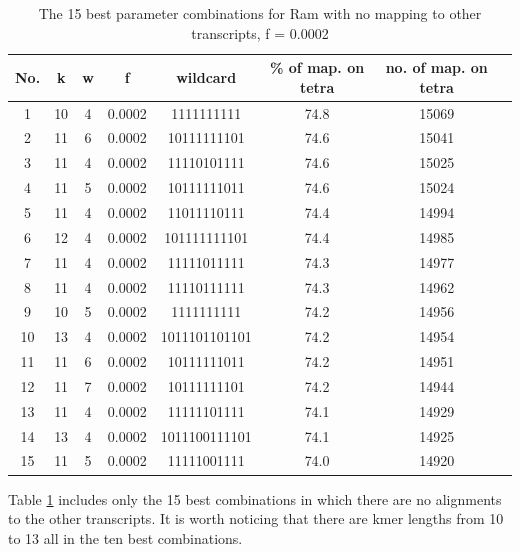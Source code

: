 \documentclass[times, utf8, zavrsni, numeric]{fer}
\begin{document}
\begin{longtable}{cccccccc}
    \caption {The 15 best parameter combinations for Ram with no mapping to other transcripts, f = 0.0002}
    \label {bestRamNoOther} \\
    \hline \multicolumn{1}{c}{\textbf{No.}} & \multicolumn{1}{c}{\textbf{k}} & \multicolumn{1}{c}{\textbf{w}}  
    & \multicolumn{1}{c}{\textbf{f}} & \multicolumn{1}{c}{\textbf{wildcard}} & \multicolumn{1}{c}{\textbf{\% of map. on tetra}}
    & \multicolumn{1}{c}{\textbf{no. of map. on tetra}}  \\ \hline
    \endfirsthead
    1 & 10 & 4 & 0.0002 & 1111111111 & 74.8 & 15069 \\ \hline
    2 & 11 & 6 & 0.0002 & 10111111101 & 74.6 & 15041 \\ \hline
    3 & 11 & 4 & 0.0002 & 11110101111 & 74.6 & 15025 \\ \hline
    4 & 11 & 5 & 0.0002 & 10111111011 & 74.6 & 15024 \\ \hline
    5 & 11 & 4 & 0.0002 & 11011110111 & 74.4 & 14994 \\ \hline
    6 & 12 & 4 & 0.0002 & 101111111101 & 74.4 & 14985 \\ \hline
    7 & 11 & 4 & 0.0002 & 11111011111 & 74.3 & 14977 \\ \hline
    8 & 11 & 4 & 0.0002 & 11110111111 & 74.3 & 14962 \\ \hline
    9 & 10 & 5 & 0.0002 & 1111111111 & 74.2 & 14956 \\ \hline
    10 & 13 & 4 & 0.0002 & 1011101101101 & 74.2 & 14954 \\ \hline
    11 & 11 & 6 & 0.0002 & 10111111011 & 74.2 & 14951 \\ \hline
    12 & 11 & 7 & 0.0002 & 10111111101 & 74.2 & 14944 \\ \hline
    13 & 11 & 4 & 0.0002 & 11111101111 & 74.1 & 14929 \\ \hline
    14 & 13 & 4 & 0.0002 & 1011100111101 & 74.1 & 14925 \\ \hline
    15 & 11 & 5 & 0.0002 & 11111001111 & 74.0 & 14920 \\ \hline
\end{longtable}

Table \ref{bestRamNoOther} includes only the 15 best combinations in which there are no alignments to the 
other transcripts. It is worth noticing that there are kmer lengths from 10 to 13 all in the ten best combinations.  \\
\end{document}
